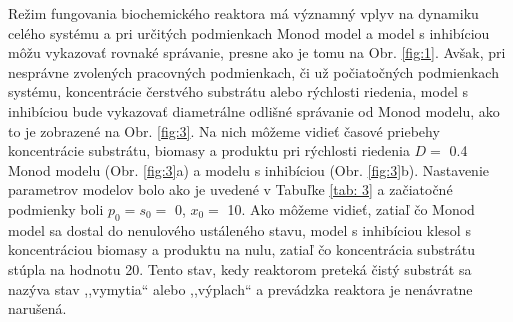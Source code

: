 Režim fungovania biochemického reaktora má významný vplyv na dynamiku celého systému a pri určitých podmienkach Monod model a model s inhibíciou môžu vykazovať rovnaké správanie, presne ako je tomu na Obr. \ref{fig:1}. Avšak, pri nesprávne zvolených pracovných podmienkach, či už počiatočných podmienkach systému, koncentrácie čerstvého substrátu alebo rýchlosti riedenia, model s inhibíciou bude vykazovať diametrálne odlišné správanie od Monod modelu, ako to je zobrazené na Obr. \ref{fig:3}. Na nich môžeme vidieť časové priebehy koncentrácie substrátu, biomasy a produktu pri rýchlosti riedenia $D = $ 0.4 Monod modelu (Obr. \ref{fig:3}a) a modelu s inhibíciou (Obr. \ref{fig:3}b). Nastavenie parametrov modelov bolo ako je uvedené v Tabuľke \ref{tab: 3} a začiatočné podmienky boli $p_0 = s_0 = $ 0, $x_0 = $ 10. Ako môžeme vidieť, zatiaľ čo Monod model sa dostal do nenulového ustáleného stavu, model s inhibíciou klesol s koncentráciou biomasy a produktu na nulu, zatiaľ čo koncentrácia substrátu stúpla na hodnotu 20. Tento stav, kedy reaktorom preteká čistý substrát sa nazýva stav ,,vymytia`` alebo ,,výplach`` a prevádzka reaktora je nenávratne narušená.

